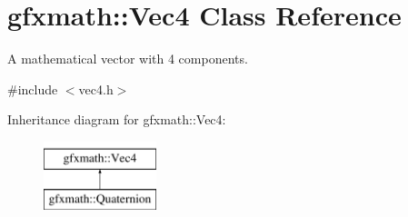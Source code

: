 \hypertarget{classgfxmath_1_1_vec4}{}\section{gfxmath\+:\+:Vec4 Class Reference}
\label{classgfxmath_1_1_vec4}


A mathematical vector with 4 components.  




{\ttfamily \#include $<$vec4.\+h$>$}

Inheritance diagram for gfxmath\+:\+:Vec4\+:\begin{figure}[H]
\begin{center}
\leavevmode
\includegraphics[height=2.000000cm]{classgfxmath_1_1_vec4}
\end{center}
\end{figure}

